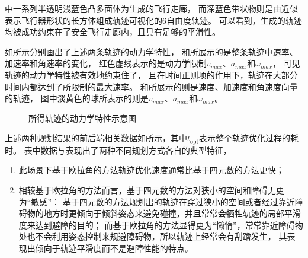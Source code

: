 中一系列半透明浅蓝色凸多面体为生成的飞行走廊，
而深蓝色带状物则是由近似表示飞行器形状的长方体组成轨迹可视化的6自由度轨迹。
可以看到，生成的轨迹均被成功约束在了安全飞行走廊内，且具有足够的平滑性。

如所示分别画出了上述两条轨迹的动力学特性，
和所展示的是整条轨迹中速率、加速率和角速率的变化，
红色虚线表示的是动力学限制$v_{max}$、$a_{max}$和$\omega_{max}$，
可见轨迹的动力学特性被有效地约束住了，
且在时间正则项的作用下，轨迹在大部分时间内都达到了所限制的最大速率。
和所展示的则是速度、加速度和角速度向量的轨迹，
图中淡黄色的球所表示的则是$v_{max}$、$a_{max}$和$\omega_{max}$。

\begin{figure}[!ht]
    \setlength{\subfigcapskip}{-1bp}
    \centering
    \begin{minipage}{\textwidth}

    \centering
    \subfigure{\label{fig:dyn_prop_quat}}\addtocounter{subfigure}{-2}
    \hspace{0.2em}
    \subfigure{\label{fig:dyn_prop_3d_quat}}\addtocounter{subfigure}{-2}

    \centering
    \subfigure{\label{fig:dyn_prop_rpy}}\addtocounter{subfigure}{-2}
    \hspace{0.2em}
    \subfigure{\label{fig:dyn_prop_3d_rpy}}\addtocounter{subfigure}{-2}
    
    \end{minipage}
    \caption{所得轨迹的动力学特性示意图}
    \label{fig:dynamic_properties}
\end{figure}

上述两种规划结果的前后端相关数据如所示，其中$t_{\text{opt}}$表示整个轨迹优化过程的耗时。
表中数据与表现出了两种不同规划方式各自的典型特征，
\begin{enumerate}
    \renewcommand{\labelenumi}{(\theenumi)}
    \item 此场景下基于欧拉角的方法轨迹优化速度通常比基于四元数的方法更快；
    \item 相较基于欧拉角的方法而言，基于四元数的方法对狭小的空间和障碍无更为“敏感”：
    基于四元数的方法规划出的轨迹在穿过狭小的空间或者经过靠近障碍物的地方时更倾向于倾斜姿态来避免碰撞，并且常常会牺牲轨迹的局部平滑度来达到避障的目的；
    而基于欧拉角的方法显得更为“懒惰”，常常靠近障碍物处也不会利用姿态控制来规避障碍物，所以轨迹上经常会有刮蹭发生，
    其表现出倾向于轨迹平滑度而不是避障性能的特点。
\end{enumerate}

